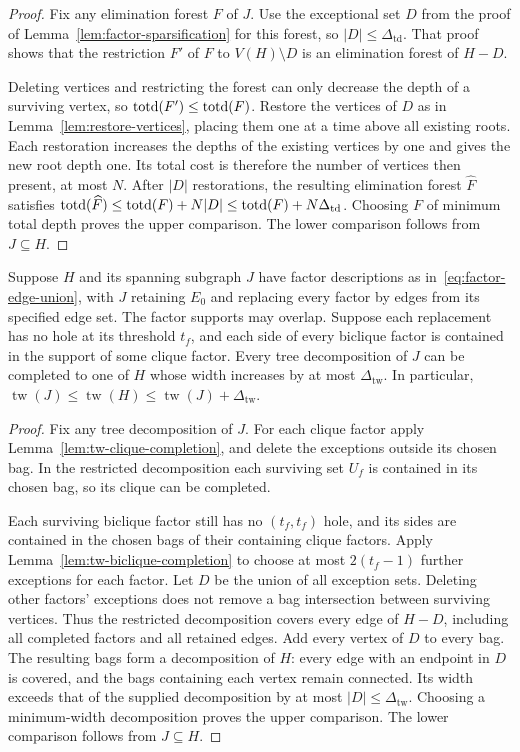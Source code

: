 \begin{proof}
Fix any elimination forest $F$ of $J$. Use the exceptional set
$D$ from the proof of Lemma~\ref{lem:factor-sparsification} for
this forest, so $|D|\le\Delta_{\mathrm{td}}$. That proof shows that the
restriction $F'$ of $F$ to $V(H)\setminus D$ is an elimination
forest of $H-D$.

Deleting vertices and restricting the forest can only decrease the
depth of a surviving vertex, so $\operatorname{totd}(F')\le\operatorname{totd}(F)$. Restore
the vertices of $D$ as in Lemma~\ref{lem:restore-vertices}, placing
them one at a time above all existing roots. Each restoration
increases the depths of the existing vertices by one and gives
the new root depth one. Its total cost is therefore the number of
vertices then present, at most $N$. After $|D|$ restorations, the
resulting elimination forest $\widehat F$ satisfies
$\operatorname{totd}(\widehat F)\le\operatorname{totd}(F)+N|D|\le\operatorname{totd}(F)+N\Delta_{\mathrm{td}}$.
Choosing $F$ of minimum total depth proves the upper
comparison. The lower comparison follows from $J\subseteq H$.
\end{proof}

\begin{lemma}
\label{lem:tw-factor-sparsification}
Suppose $H$ and its spanning subgraph $J$ have factor descriptions
as in~\eqref{eq:factor-edge-union}, with $J$ retaining $E_0$ and
replacing every factor by edges from its specified edge set. The
factor supports may overlap. Suppose each replacement has no hole at
its threshold $t_f$, and each side of every biclique factor is
contained in the support of some clique factor. Every tree
decomposition of $J$ can be completed to one of $H$ whose width
increases by at most $\Delta_{\mathrm{tw}}$. In particular,
$\operatorname{tw}(J)\le\operatorname{tw}(H)
 \le\operatorname{tw}(J)+\Delta_{\mathrm{tw}}$.
\end{lemma}

\begin{proof}
Fix any tree decomposition of $J$. For each clique
factor apply Lemma~\ref{lem:tw-clique-completion}, and delete
the exceptions outside its chosen bag. In the restricted
decomposition each surviving set $U_f$ is contained in
its chosen bag, so its clique can be completed.

Each surviving biclique factor still has no $(t_f,t_f)$ hole,
and its sides are contained in the chosen bags of their containing
clique factors.
Apply Lemma~\ref{lem:tw-biclique-completion} to choose at most
$2(t_f-1)$ further exceptions for each factor. Let $D$ be the
union of all exception sets. Deleting other factors' exceptions
does not remove a bag intersection between surviving vertices.
Thus the restricted decomposition covers every edge of $H-D$,
including all completed factors and all retained edges.
Add every vertex of $D$ to every bag. The resulting bags form a
decomposition of $H$: every edge with an endpoint in $D$ is covered,
and the bags containing each vertex remain connected. Its width exceeds
that of the supplied decomposition by at most $|D|\le\Delta_{\mathrm{tw}}$.
Choosing a minimum-width decomposition proves the upper comparison.
The lower comparison follows from $J\subseteq H$.
\end{proof}

